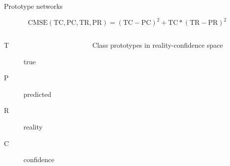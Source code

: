 \documentclass[pdf]{beamer}
\newcommand{\?}{\ensuremath{^\texttt{\bf [CITATION~NEEDED]}}}
\begin{document}
\begin{frame}{Prototype networks}

\begin{equation}
\text{CMSE}(\text{TC}, \text{PC}, \text{TR}, \text{PR}) = (\text{TC} - \text{PC})^2 + \text{TC} * (\text{TR} - \text{PR})^2
\end{equation}

\begin{columns}[t]

\begin{column}{5cm}

\begin{description}
\item[T] true
\item[P] predicted
\item[R] reality
\item[C] confidence
\end{description}

\end{column}

\begin{column}{5cm}
\begin{figure}
\centering
{}
\caption{Class prototypes in reality-confidence space}
\label{fig_prototype}
\end{figure}
\end{column}

\end{columns}

\end{frame}
\end{document}
